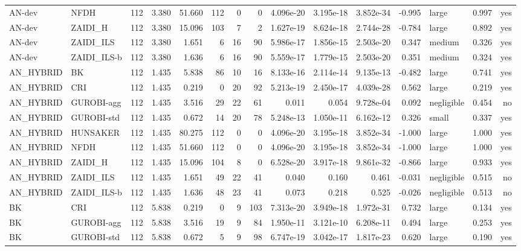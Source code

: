 \begin{table}[htbp]
\begin{tabular}{llrrrrrrrrrrlrr}
AN-dev & NFDH & 112 & 3.380 & 51.660 & 112 & 0 & 0 & 4.096e-20 & 3.195e-18 & 3.852e-34 & -0.995 & large & 0.997 & yes \\
AN-dev & ZAIDI\_H & 112 & 3.380 & 15.096 & 103 & 7 & 2 & 1.627e-19 & 8.624e-18 & 2.744e-28 & -0.784 & large & 0.892 & yes \\
AN-dev & ZAIDI\_ILS & 112 & 3.380 & 1.651 & 6 & 16 & 90 & 5.986e-17 & 1.856e-15 & 2.503e-20 & 0.347 & medium & 0.326 & yes \\
AN-dev & ZAIDI\_ILS-b & 112 & 3.380 & 1.636 & 6 & 16 & 90 & 5.559e-17 & 1.779e-15 & 2.503e-20 & 0.351 & medium & 0.324 & yes \\
AN\_HYBRID & BK & 112 & 1.435 & 5.838 & 86 & 10 & 16 & 8.133e-16 & 2.114e-14 & 9.135e-13 & -0.482 & large & 0.741 & yes \\
AN\_HYBRID & CRI & 112 & 1.435 & 0.219 & 0 & 20 & 92 & 5.213e-19 & 2.450e-17 & 4.039e-28 & 0.562 & large & 0.219 & yes \\
AN\_HYBRID & GUROBI-agg & 112 & 1.435 & 3.516 & 29 & 22 & 61 & 0.011 & 0.054 & 9.728e-04 & 0.092 & negligible & 0.454 & no \\
AN\_HYBRID & GUROBI-std & 112 & 1.435 & 0.672 & 14 & 20 & 78 & 5.248e-13 & 1.050e-11 & 6.162e-12 & 0.326 & small & 0.337 & yes \\
AN\_HYBRID & HUNSAKER & 112 & 1.435 & 80.275 & 112 & 0 & 0 & 4.096e-20 & 3.195e-18 & 3.852e-34 & -1.000 & large & 1.000 & yes \\
AN\_HYBRID & NFDH & 112 & 1.435 & 51.660 & 112 & 0 & 0 & 4.096e-20 & 3.195e-18 & 3.852e-34 & -1.000 & large & 1.000 & yes \\
AN\_HYBRID & ZAIDI\_H & 112 & 1.435 & 15.096 & 104 & 8 & 0 & 6.528e-20 & 3.917e-18 & 9.861e-32 & -0.866 & large & 0.933 & yes \\
AN\_HYBRID & ZAIDI\_ILS & 112 & 1.435 & 1.651 & 49 & 22 & 41 & 0.040 & 0.160 & 0.461 & -0.031 & negligible & 0.515 & no \\
AN\_HYBRID & ZAIDI\_ILS-b & 112 & 1.435 & 1.636 & 48 & 23 & 41 & 0.073 & 0.218 & 0.525 & -0.026 & negligible & 0.513 & no \\
BK & CRI & 112 & 5.838 & 0.219 & 0 & 9 & 103 & 7.313e-20 & 3.949e-18 & 1.972e-31 & 0.732 & large & 0.134 & yes \\
BK & GUROBI-agg & 112 & 5.838 & 3.516 & 19 & 9 & 84 & 1.950e-11 & 3.121e-10 & 6.208e-11 & 0.494 & large & 0.253 & yes \\
BK & GUROBI-std & 112 & 5.838 & 0.672 & 5 & 9 & 98 & 6.747e-19 & 3.042e-17 & 1.817e-23 & 0.620 & large & 0.190 & yes \\

\end{tabular}
\end{table}

